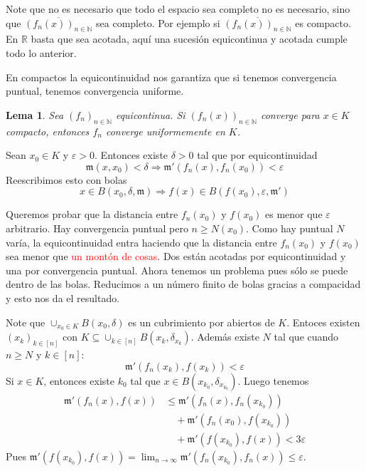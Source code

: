 \documentclass[12pt]{article}
\theoremstyle{plain}
\newtheorem{Lem}[Th]{Lema}             %
\theoremstyle{definition}
\theoremstyle{remark}
\numberwithin{equation}{section}
\newcommand{\bN}{\mathbb{N}}        %
\newcommand{\bR}{\mathbb{R}}        %
\newcommand{\mm}{\mathfrak{m}}      %
\renewcommand{\geq}{\geqslant}      %
\renewcommand{\leq}{\leqslant}      %
\renewcommand{\:}{\colon}           %
\newcommand{\bonj}[1]{\left\lbrack#1\right\rbrack}
\begin{document}
\begin{multicols}{2}
Note que no es necesario que todo el espacio sea completo no es necesario, sino que $\overline{(f_n(x))_{n\in\bN}}$ sea completo. Por ejemplo si $\overline{(f_n(x))_{n\in\bN}}$ es compacto. En $\bR$ basta que sea acotada, aquí una sucesión equicontinua y acotada cumple todo lo anterior.\par

En compactos la equicontinuidad nos garantiza que si tenemos convergencia puntual, tenemos convergencia uniforme.

\begin{Lem}
  Sea $(f_n)_{n\in\bN}$ equicontinua. Si $(f_n(x))_{n\in\bN}$ converge para $x\in K$ compacto, entonces $f_n$ converge uniformemente en $K$.
\end{Lem}

\begin{ptcbp}
Sean $x_0\in K$ y $\varepsilon>0$. Entonces existe $\delta>0$ tal que por equicontinuidad
$$\mm(x,x_0)<\delta\Rightarrow\mm'(f_n(x),f_n(x_0))<\varepsilon$$
Reescribimos esto con bolas
$$x\in B(x_0,\delta,\mm)\Rightarrow f(x)\in B(f(x_0),\varepsilon,\mm')$$

Queremos probar que la distancia entre $f_n(x_0)$ y $f(x_0)$ es menor que $\varepsilon$ arbitrario. Hay convergencia puntual pero $n\geq N(x_0)$. Como hay puntual $N$ varía, la equicontinuidad entra haciendo que la distancia entre $f_n(x_0)$ y $f(x_0)$ sea menor que \textcolor{red}{un montón de cosas}. Dos están acotadas por equicontinuidad y una por convergencia puntual. Ahora tenemos un problema pues sólo se puede dentro de las bolas. Reducimos a un número finito de bolas gracias a compacidad y esto nos da el resultado.\par

Note que $\cup_{x_0\in K}B(x_0,\delta)$ es un cubrimiento por abiertos de $K$. Entoces existen $(x_k)_{k\in\bonj{n}}$ con $K\subseteq\cup_{k\in\bonj{n}}B(x_k,\delta_{x_k})$. Además existe $N$ tal que cuando $n\geq N$ y $k\in\bonj{n}$:
$$\mm'(f_n(x_k),f(x_k))<\varepsilon$$
Si $x\in K$, entonces existe $k_0$ tal que $x\in B(x_{k_0},\delta_{x_{k_0}})$. Luego tenemos
\begin{align*}
  \mm'(f_n(x),f(x)) &\leq \mm'(f_n(x),f_n(x_{k_0})) \\
                         &\quad+\mm'(f_n(x_0),f(x_{k_0}))\\
                         &\quad+\mm'(f(x_{k_0}),f(x))<3\varepsilon
\end{align*}
Pues $\mm'(f(x_{k_0}),f(x))=\lim_{n\to\infty}\mm'(f_n(x_{k_0}),f_n(x))\leq \varepsilon$.
\end{ptcbp}


\end{multicols}
\end{document}
